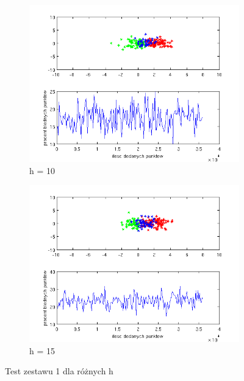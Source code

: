 \documentclass[10pt,a4paper]{article}
\begin{document}
\begin{figure}[H]
     \begin{subfigure}[b]{0.5\textwidth}
    \includegraphics[width=\textwidth]{test_h10.png}
    \caption{h = 10}
  \end{subfigure}
  \hfill
  \begin{subfigure}[b]{0.5\textwidth}
    \includegraphics[width=\textwidth]{test_h15.png}
    \caption{h = 15}
  \end{subfigure}
  
  \caption{Test zestawu 1 dla różnych h}
  \label{test_h}
  
\end{figure}
\end{document}
